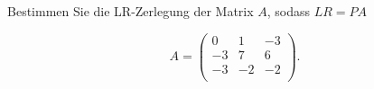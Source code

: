 \newpage

\subsubsection{} %
Bestimmen Sie die LR-Zerlegung der Matrix \( A \), sodass \( LR = PA \)

\begin{equation*}
    A = \begin{pmatrix}
    0 & 1 & -3 \\
    -3 & 7 & 6 \\
    -3 & -2 & -2 \\
    \end{pmatrix}.
\end{equation*}

\vspace{1\baselineskip}

